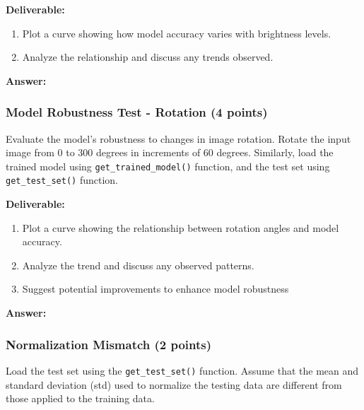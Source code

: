 \documentclass[11pt, oneside]{article}   	%
\begin{document}
\noindent\textbf{Deliverable:}

\begin{enumerate}
    \item  Plot a curve showing how model accuracy varies with brightness levels.
    \item Analyze the relationship and discuss any trends observed.
\end{enumerate}


\begin{answerbox} \textbf{Answer:} \vspace*{1cm}

\end{answerbox}


\subsubsection*{Model Robustness Test - Rotation (4 points)}

Evaluate the model's robustness to changes in image rotation. Rotate the input image from $0$ to $300$ degrees in increments of $60$ degrees. 
Similarly, load the trained model using \texttt{get\_trained\_model()} function, and the test set using \texttt{get\_test\_set()} function. 

\noindent\textbf{Deliverable:}

\begin{enumerate}
    \item Plot a curve showing the relationship between rotation angles and model accuracy.
    \item Analyze the trend and discuss any observed patterns.
    \item Suggest potential improvements to enhance model robustness
\end{enumerate}



\begin{answerbox} \textbf{Answer:} \vspace*{1cm}

\end{answerbox}


\subsubsection*{Normalization Mismatch (2 points)}

Load the test set using the \texttt{get\_test\_set()} function. Assume that the mean and standard deviation (std) used to normalize the testing data are different from those applied to the training data.
\end{document}
